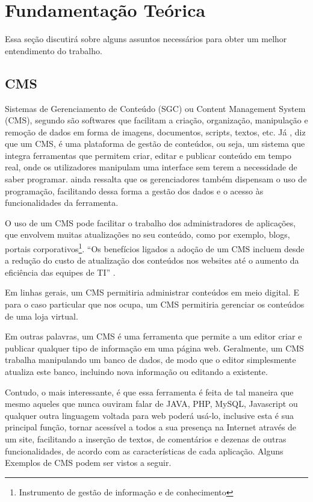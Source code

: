 \documentclass[a4paper,12pt]{monografia}
\begin{document}
\chapter{Fundamentação Teórica} %
\label{cha:fundamentaco_teorica}

Essa seção discutirá sobre alguns assuntos necessários para obter um melhor entendimento do trabalho.

\section{CMS} %
\label{sec:cms}

Sistemas de Gerenciamento de Conteúdo (SGC) ou Content Management System (CMS), segundo  são softwares que facilitam a criação, organização, manipulação e remoção de dados em forma de imagens, documentos, scripts, textos, etc.
Já , diz que um CMS, é uma plataforma de gestão de conteúdos, ou seja, um sistema que integra ferramentas que permitem criar, editar e publicar conteúdo em tempo real, onde os utilizadores manipulam uma interface sem terem a necessidade de saber programar.  ainda ressalta que os gerenciadores também dispensam o uso de programação, facilitando dessa forma a gestão dos dados e o acesso às funcionalidades da ferramenta.

O uso de um CMS pode facilitar o trabalho dos administradores de aplicações, que envolvem muitas atualizações no seu conteúdo, como por exemplo, blogs, portais corporativos\footnote{Instrumento de gestão de informação e de conhecimento}. ``Os benefícios ligados a adoção de um CMS incluem desde a redução do custo de atualização dos conteúdos nos websites até o aumento da eficiência das equipes de TI'' \cite{pereira}.

Em linhas gerais, um CMS permitiria administrar conteúdos em meio digital. E para o caso particular que nos ocupa, um CMS permitiria gerenciar os conteúdos de uma loja virtual.

Em outras palavras, um CMS é uma ferramenta que permite a um editor criar e publicar qualquer tipo de informação em uma página web. Geralmente, um CMS trabalha manipulando um banco de dados, de modo que o editor simplesmente atualiza este banco, incluindo nova informação ou editando a existente.

Contudo, o mais interessante, é que essa ferramenta é feita de tal maneira que mesmo aqueles que nunca ouviram falar de JAVA, PHP, MySQL, Javascript ou qualquer outra linguagem voltada para web poderá usá-lo, inclusive esta é sua principal função, tornar acessível a todos a sua presença na Internet através de um site, facilitando a inserção de textos, de comentários e dezenas de outras funcionalidades, de acordo com as características de cada aplicação. Alguns Exemplos de CMS podem ser vistos a seguir.
\end{document}
